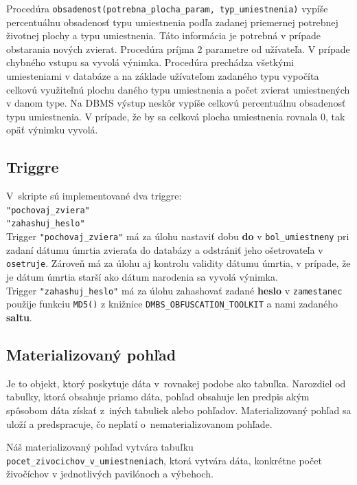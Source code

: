 \documentclass[a4paper, 11pt]{article}
\begin{document}
	Procedúra \texttt{obsadenost(potrebna\_plocha\_param, typ\_umiestnenia)} vypíše percentuálnu obsadenosť typu umiestnenia podľa zadanej priemernej potrebnej životnej plochy a typu umiestnenia. Táto informácia je potrebná v prípade obstarania nových zvierat. Procedúra príjma 2 parametre od užívateľa. V prípade chybného vstupu sa vyvolá výnimka. Procedúra prechádza všetkými umiesteniami v databáze a na základe užívateľom zadaného typu vypočíta celkovú využiteľnú plochu daného typu umiestnenia a počet zvierat umiestnených v danom type. Na DBMS výstup neskôr vypíše celkovú percentuálnu obsadenosť typu umiestnenia. V prípade, že by sa celková plocha umiestnenia rovnala 0, tak opäť výnimku vyvolá.
	
	\subsection{Triggre}
	V~skripte sú implementované dva triggre: \\
	\texttt{"pochovaj\_zviera"}\\
	\texttt{"zahashuj\_heslo"}\\
	
	Trigger \texttt{"pochovaj\_zviera"} má za úlohu nastaviť dobu \textbf{do} v \texttt{bol\_umiestneny} pri zadaní dátumu úmrtia zvieraťa do databázy a odstrániť jeho ošetrovateľa v \texttt{osetruje}. Zároveň má za úlohu aj kontrolu validity dátumu úmrtia, v prípade, že je dátum úmrtia starší ako dátum narodenia sa vyvolá výnimka.\\
	
	Trigger \texttt{"zahashuj\_heslo"} má za úlohu zahashovať zadané \textbf{heslo} v \texttt{zamestanec} použije funkciu \texttt{MD5()} z knižnice \texttt{DMBS\_OBFUSCATION\_TOOLKIT} a nami zadaného \textbf{saltu}.
	
	\subsection{Materializovaný pohľad}
	Je to objekt, ktorý poskytuje dáta v~rovnakej podobe ako tabuľka. Narozdiel od tabuľky, ktorá obsahuje priamo dáta, pohľad obsahuje len predpis akým spôsobom dáta získať z~iných tabuliek alebo pohľadov. Materializovaný pohľad sa uloží a predspracuje, čo neplatí o~nematerializovanom pohľade.\\
	\par Náš materializovaný pohľad vytvára tabuľku \texttt{pocet\_zivocichov\_v\_umiestneniach}, ktorá vytvára dáta, konkrétne počet živočíchov v jednotlivých pavilónoch a výbehoch.
\end{document}
